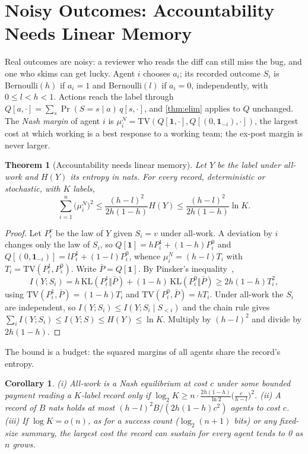 \documentclass[sigconf,anonymous,acmthm=false]{aamas}
\theoremstyle{acmplain}
\newtheorem{theorem}{Theorem}
\newtheorem{corollary}{Corollary}
\theoremstyle{acmdefinition}
\newcommand{\TV}{\mathrm{TV}}
\begin{document}
\section{Noisy Outcomes: Accountability Needs Linear Memory}\label{sec:noisy}

Real outcomes are noisy: a reviewer who reads the diff can still miss the bug, and one who
skims can get lucky. Agent $i$ chooses $a_i$; its recorded outcome $S_i$ is Bernoulli$(h)$ if
$a_i=1$ and Bernoulli$(l)$ if $a_i=0$, independently, with $0\le l<h<1$. Actions reach the
label through $Q[a,\cdot]=\sum_s\Pr(S=s\mid a)\,q[s,\cdot]$, and \cref{thm:elim} applies to
$Q$ unchanged. The \emph{Nash margin} of agent $i$ is
$\mu_i^N=\TV(Q[\mathbf1,\cdot],Q[(0,\mathbf1_{-i}),\cdot])$, the largest cost at which
working is a best response to a working team; the ex-post margin is never larger.

\begin{theorem}[Accountability needs linear memory]\label{thm:noisy}
Let $Y$ be the label under all-work and $H(Y)$ its entropy in nats. For every record,
deterministic or stochastic, with $K$ labels,
\[ \sum_{i=1}^n\big(\mu_i^N\big)^2\le\frac{(h-l)^2}{2h(1-h)}H(Y)\le\frac{(h-l)^2}{2h(1-h)}\ln K. \]
\end{theorem}

\begin{proof}
Let $P_i^v$ be the law of $Y$ given $S_i=v$ under all-work. A deviation by $i$ changes only
the law of $S_i$, so $Q[\mathbf1]=hP_i^1+(1-h)P_i^0$ and
$Q[(0,\mathbf1_{-i})]=lP_i^1+(1-l)P_i^0$, whence $\mu_i^N=(h-l)T_i$ with
$T_i=\TV(P_i^1,P_i^0)$. Write $\bar P=Q[\mathbf1]$. By Pinsker's inequality~\cite{cover2006},
\[ I(Y;S_i)=h\,\mathrm{KL}(P_i^1\Vert\bar P)+(1-h)\,\mathrm{KL}(P_i^0\Vert\bar P)\ge2h(1-h)T_i^2, \]
using $\TV(P_i^1,\bar P)=(1-h)T_i$ and $\TV(P_i^0,\bar P)=hT_i$. Under all-work the $S_i$ are
independent, so $I(Y;S_i)\le I(Y;S_i\mid S_{<i})$ and the chain rule gives
$\sum_iI(Y;S_i)\le I(Y;S)\le H(Y)\le\ln K$. Multiply by $(h-l)^2$ and divide by $2h(1-h)$.
\end{proof}

The bound is a budget: the squared margins of all agents share the record's entropy.

\begin{corollary}\label{cor:noisy}
(i) All-work is a Nash equilibrium at cost $c$ under some bounded payment reading a $K$-label
record only if $\log_2K\ge n\cdot\frac{2h(1-h)}{\ln2}\big(\frac c{h-l}\big)^2$. (ii) A record
of $B$ nats holds at most $(h-l)^2B/(2h(1-h)c^2)$ agents to cost $c$. (iii) If $\log K=o(n)$,
as for a success count ($\log_2(n+1)$ bits) or any fixed-size summary, the largest cost the
record can sustain for every agent tends to 0 as $n$ grows.
\end{corollary}
\end{document}
